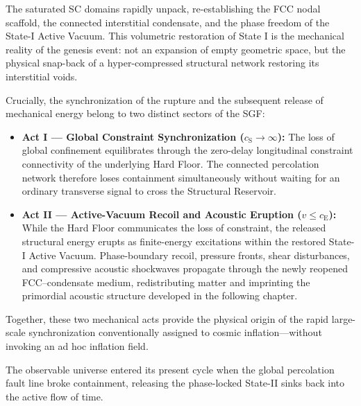 The saturated SC domains rapidly unpack, re-establishing the FCC nodal scaffold, the connected interstitial condensate, and the phase freedom of the State-I Active Vacuum. This volumetric restoration of State I is the mechanical reality of the genesis event: not an expansion of empty geometric space, but the physical snap-back of a hyper-compressed structural network restoring its interstitial voids.

Crucially, the synchronization of the rupture and the subsequent release of mechanical energy belong to two distinct sectors of the SGF:
\begin{itemize}
    \item \textbf{Act I --- Global Constraint Synchronization ($c_{\mathrm{S}} \to \infty$):} The loss of global confinement equilibrates through the zero-delay longitudinal constraint connectivity of the underlying Hard Floor. The connected percolation network therefore loses containment simultaneously without waiting for an ordinary transverse signal to cross the Structural Reservoir.
    \item \textbf{Act II --- Active-Vacuum Recoil and Acoustic Eruption ($v \le c_{\mathrm{E}}$):} While the Hard Floor communicates the loss of constraint, the released structural energy erupts as finite-energy excitations within the restored State-I Active Vacuum. Phase-boundary recoil, pressure fronts, shear disturbances, and compressive acoustic shockwaves propagate through the newly reopened FCC--condensate medium, redistributing matter and imprinting the primordial acoustic structure developed in the following chapter.
\end{itemize}

Together, these two mechanical acts provide the physical origin of the rapid large-scale synchronization conventionally assigned to cosmic inflation---without invoking an ad hoc inflation field.

\enlargethispage{\baselineskip}
The observable universe entered its present cycle when the global percolation fault line broke containment, releasing the phase-locked State-II sinks back into the active flow of time.